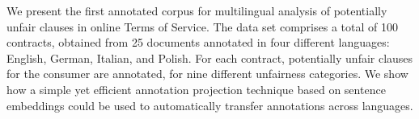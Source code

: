 We present the first annotated corpus for multilingual analysis of potentially unfair clauses in online Terms of Service. The data set comprises a total of 100 contracts, obtained from 25 documents annotated in four different languages: English, German, Italian, and Polish. For each contract, potentially unfair clauses for the consumer are annotated, for nine different unfairness categories. We show how a simple yet efficient annotation projection technique based on sentence embeddings could be used to automatically transfer annotations across languages.
